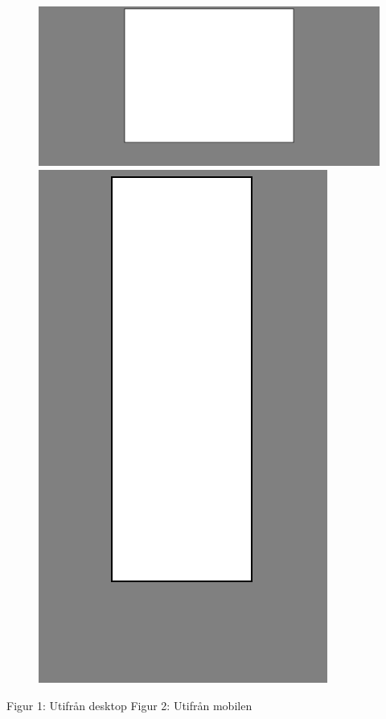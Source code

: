\documentclass[11pt]{article}
\begin{document}
\vspace{0.5cm}
\begin{figure}[h]
\centerline{%
\includegraphics[scale=0.23]{pics/big.png}\hspace{5em}%
\includegraphics[scale=0.30]{pics/small.png}%
}
\end{figure}
\hspace{1.5cm}Figur 1: Utifrån desktop \hspace{4.8cm} Figur 2: Utifrån mobilen
\end{document}
